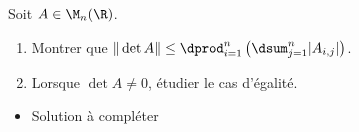 \begin{enonce}
\begin{exercise}[ID={RMS134 E575},subtitle={Oral
    Mines-Ponts},theme={algebre},annee={2023},concours={mines-ponts},filiere={MP}, difficulty={0}]
  Soit $A\in\M_n(\R)$.
  \begin{enumerate}
  \item Montrer que $\|\det
    A\|\le\dprod_{i=1}^n\left(\dsum_{j=1}^n|A_{i,j}|\right)$.
  \item Lorsque $\det A\neq 0$, étudier le cas d'égalité.
  \end{enumerate}
\end{exercise}
\begin{solution}
  \begin{itemize}
  \item Solution à compléter
  \end{itemize}
\end{solution}
\end{enonce}